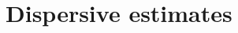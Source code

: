 \documentclass[12pt,oneside,onecolumn,open]{article}
\newtheorem{lema}[teo]{Lemma}
\begin{document}
  
\color{black}

 \section{Dispersive estimates}\label{dispersiveesimates}

 

 
\color{black}
\end{document}
